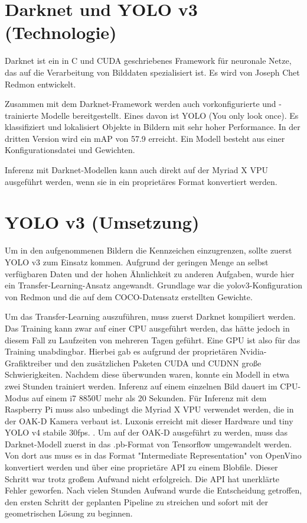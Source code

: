\chapter{Darknet und YOLO v3 (Technologie)}
	
	Darknet ist ein in C und CUDA geschriebenes Framework für neuronale Netze, das auf die Verarbeitung von Bilddaten spezialisiert ist. Es wird von Joseph Chet Redmon entwickelt. \autocite{darknet13}
	
	Zusammen mit dem Darknet-Framework werden auch vorkonfigurierte und -trainierte Modelle bereitgestellt. Eines davon ist YOLO (You only look once). Es klassifiziert und lokalisiert Objekte in Bildern mit sehr hoher Performance. In der dritten Version wird ein mAP von 57.9 erreicht. Ein Modell besteht aus einer Konfigurationsdatei und Gewichten. \autocite{yolov3}
	
	Inferenz mit Darknet-Modellen kann auch direkt auf der Myriad X VPU ausgeführt werden, wenn sie in ein proprietäres Format konvertiert werden.
	
	
\chapter{YOLO v3 (Umsetzung)}

Um in den aufgenommenen Bildern die Kennzeichen einzugrenzen, sollte zuerst YOLO v3 zum Einsatz kommen. Aufgrund der geringen Menge an selbst verfügbaren Daten und der hohen Ähnlichkeit zu anderen Aufgaben, wurde hier ein Transfer-Learning-Ansatz angewandt. Grundlage war die yolov3-Konfiguration von Redmon und die auf dem COCO-Datensatz erstellten Gewichte.

Um das Transfer-Learning auszuführen, muss zuerst Darknet kompiliert werden. Das Training kann zwar auf einer CPU ausgeführt werden, das hätte jedoch in diesem Fall zu Laufzeiten von mehreren Tagen geführt. Eine GPU ist also für das Training unabdingbar.
Hierbei gab es aufgrund der proprietären Nvidia-Grafiktreiber und den zusätzlichen Paketen CUDA und CUDNN große Schwierigkeiten.
Nachdem diese überwunden waren, konnte ein Modell in etwa zwei Stunden trainiert werden. Inferenz auf einem einzelnen Bild dauert im CPU-Modus auf einem i7 8850U mehr als 20 Sekunden. Für Inferenz mit dem Raspberry Pi muss also unbedingt die Myriad X VPU verwendet werden, die in der OAK-D Kamera verbaut ist. Luxonis erreicht mit dieser Hardware und tiny YOLO v4 stabile 30fps. \autocite{Luxonis1}.
Um auf der OAK-D ausgeführt zu werden, muss das Darknet-Modell zuerst in das .pb-Format von Tensorflow umgewandelt werden.
Von dort aus muss es in das Format "Intermediate Representation" von OpenVino konvertiert werden und über eine proprietäre API zu einem Blobfile.
Dieser Schritt war trotz großem Aufwand nicht erfolgreich. Die API hat unerklärte Fehler geworfen. Nach vielen Stunden Aufwand wurde die Entscheidung getroffen, den ersten Schritt der geplanten Pipeline zu streichen und sofort mit der geometrischen Lösung zu beginnen.